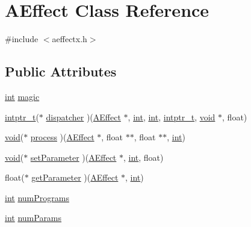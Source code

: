 \hypertarget{class_a_effect}{}\section{A\+Effect Class Reference}
\label{class_a_effect}


{\ttfamily \#include $<$aeffectx.\+h$>$}

\subsection*{Public Attributes}
\begin{DoxyCompactItemize}
\item 
\hyperlink{xmltok_8h_a5a0d4a5641ce434f1d23533f2b2e6653}{int} \hyperlink{class_a_effect_a8befa10d161c594de86507153cc74b1e}{magic}
\item 
\hyperlink{lib-src_2ffmpeg_2win32_2stdint_8h_a0fbe4a4f8dd857ee04923a901f27465f}{intptr\+\_\+t}($\ast$ \hyperlink{class_a_effect_a5873202548d2794e1a52a8b91ce2ccff}{dispatcher} )(\hyperlink{class_a_effect}{A\+Effect} $\ast$, \hyperlink{xmltok_8h_a5a0d4a5641ce434f1d23533f2b2e6653}{int}, \hyperlink{xmltok_8h_a5a0d4a5641ce434f1d23533f2b2e6653}{int}, \hyperlink{lib-src_2ffmpeg_2win32_2stdint_8h_a0fbe4a4f8dd857ee04923a901f27465f}{intptr\+\_\+t}, \hyperlink{sound_8c_ae35f5844602719cf66324f4de2a658b3}{void} $\ast$, float)
\item 
\hyperlink{sound_8c_ae35f5844602719cf66324f4de2a658b3}{void}($\ast$ \hyperlink{class_a_effect_ae525abf807ced8ef2e895a73392fdb47}{process} )(\hyperlink{class_a_effect}{A\+Effect} $\ast$, float $\ast$$\ast$, float $\ast$$\ast$, \hyperlink{xmltok_8h_a5a0d4a5641ce434f1d23533f2b2e6653}{int})
\item 
\hyperlink{sound_8c_ae35f5844602719cf66324f4de2a658b3}{void}($\ast$ \hyperlink{class_a_effect_a871faae111b1c4c4de4232de2eb532a4}{set\+Parameter} )(\hyperlink{class_a_effect}{A\+Effect} $\ast$, \hyperlink{xmltok_8h_a5a0d4a5641ce434f1d23533f2b2e6653}{int}, float)
\item 
float($\ast$ \hyperlink{class_a_effect_ab39d6235285c58b453309d3c669448ea}{get\+Parameter} )(\hyperlink{class_a_effect}{A\+Effect} $\ast$, \hyperlink{xmltok_8h_a5a0d4a5641ce434f1d23533f2b2e6653}{int})
\item 
\hyperlink{xmltok_8h_a5a0d4a5641ce434f1d23533f2b2e6653}{int} \hyperlink{class_a_effect_a57c21fba27c94b3c123abd21b1bef16f}{num\+Programs}
\item 
\hyperlink{xmltok_8h_a5a0d4a5641ce434f1d23533f2b2e6653}{int} \hyperlink{class_a_effect_a0e5ed85d0d00ebec2eac117079e0086b}{num\+Params}

\end{DoxyCompactItemize}
